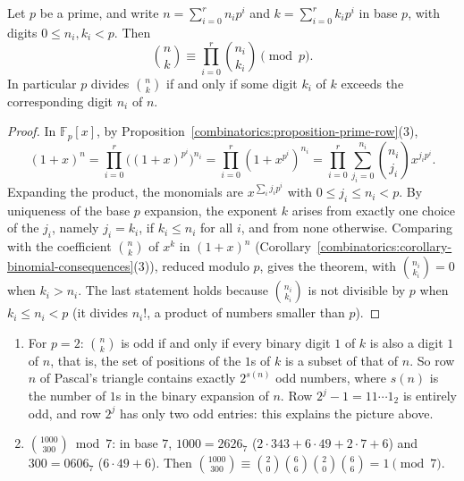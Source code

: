 \begin{theorem}[Lucas]\label{combinatorics:theorem-lucas}
Let $p$ be a prime, and write $n = \sum_{i=0}^{r}n_ip^i$ and $k = \sum_{i=0}^{r}k_ip^i$ in base $p$, with digits $0 \leq n_i, k_i < p$. Then
\[
\binom{n}{k} \equiv \prod_{i=0}^{r}\binom{n_i}{k_i} \pmod p .
\]
In particular $p$ divides $\binom{n}{k}$ if and only if some digit $k_i$ of $k$ exceeds the corresponding digit $n_i$ of $n$.
\end{theorem}

\begin{proof}
In $\mathbb{F}_p[x]$, by Proposition~\ref{combinatorics:proposition-prime-row}(3),
\[
(1 + x)^n = \prod_{i=0}^{r}\bigl((1 + x)^{p^i}\bigr)^{n_i} = \prod_{i=0}^{r}(1 + x^{p^i})^{n_i} = \prod_{i=0}^{r}\sum_{j_i=0}^{n_i}\binom{n_i}{j_i}x^{j_ip^i}.
\]
Expanding the product, the monomials are $x^{\sum_ij_ip^i}$ with $0 \leq j_i \leq n_i < p$. By uniqueness of the base $p$ expansion, the exponent $k$ arises from exactly one choice of the $j_i$, namely
$j_i = k_i$, if $k_i \leq n_i$ for all $i$, and from none otherwise. Comparing with the coefficient $\binom{n}{k}$ of $x^k$ in $(1 + x)^n$ (Corollary~\ref{combinatorics:corollary-binomial-consequences}(3)),
reduced modulo $p$, gives the theorem, with $\binom{n_i}{k_i} = 0$ when $k_i > n_i$. The last statement holds because $\binom{n_i}{k_i}$ is not divisible by $p$ when $k_i \leq n_i < p$ (it divides
$n_i!$, a product of numbers smaller than $p$).
\end{proof}

\begin{example}\label{combinatorics:example-lucas}
\begin{enumerate}
\item For $p = 2$: $\binom{n}{k}$ is odd if and only if every binary digit $1$ of $k$ is also a digit $1$ of $n$, that is, the set of positions of the $1$s of $k$ is a subset of that of $n$. So row $n$ of
Pascal's triangle contains exactly $2^{s(n)}$ odd numbers, where $s(n)$ is the number of $1$s in the binary expansion of $n$. Row $2^j - 1 = 11\cdots1_2$ is entirely odd, and row $2^j$ has only two odd
entries: this explains the picture above.
\item $\binom{1000}{300} \bmod 7$: in base $7$, $1000 = 2626_7$ ($2 \cdot 343 + 6 \cdot 49 + 2 \cdot 7 + 6$) and $300 = 0606_7$ ($6 \cdot 49 + 6$). Then
$\binom{1000}{300} \equiv \binom{2}{0}\binom{6}{6}\binom{2}{0}\binom{6}{6} = 1 \pmod 7$.
\end{enumerate}
\end{example}

